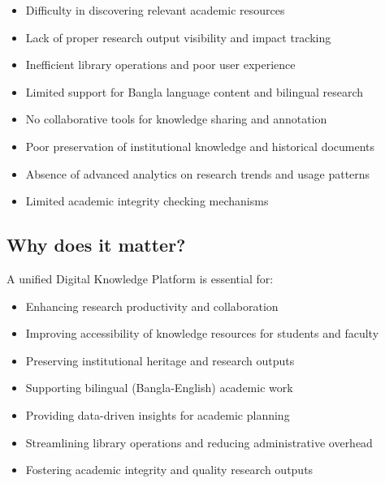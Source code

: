 \documentclass[12pt,a4paper]{report}
\begin{document}
\begin{itemize}
    \item Difficulty in discovering relevant academic resources
    \item Lack of proper research output visibility and impact tracking
    \item Inefficient library operations and poor user experience
    \item Limited support for Bangla language content and bilingual research
    \item No collaborative tools for knowledge sharing and annotation
    \item Poor preservation of institutional knowledge and historical documents
    \item Absence of advanced analytics on research trends and usage patterns
    \item Limited academic integrity checking mechanisms
\end{itemize}

\subsection{Why does it matter?}

A unified Digital Knowledge Platform is essential for:
\begin{itemize}
    \item Enhancing research productivity and collaboration
    \item Improving accessibility of knowledge resources for students and faculty
    \item Preserving institutional heritage and research outputs
    \item Supporting bilingual (Bangla-English) academic work
    \item Providing data-driven insights for academic planning
    \item Streamlining library operations and reducing administrative overhead
    \item Fostering academic integrity and quality research outputs
\end{itemize}
\end{document}
